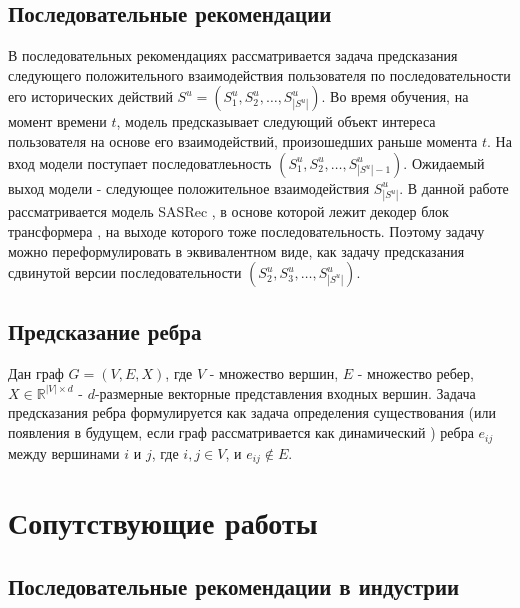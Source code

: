 \documentclass{article}
\begin{document}
\subsection{Последовательные рекомендации}
В последовательных рекомендациях рассматривается задача предсказания следующего положительного взаимодействия 
пользователя по последовательности его исторических действий $S^u = (S_1^u, S_2^u, \dots, S_{|S^u|}^u)$.
Во время обучения, на момент времени $t$, модель предсказывает следующий объект интереса пользователя на основе его
взаимодействий, произошедших раньше момента $t$. На вход модели поступает последоватлеьность
$(S_1^u, S_2^u, \dots, S^u_{|S^u| - 1})$. Ожидаемый выход модели - следующее положительное взаимодействия $S^u_{|S^u|}$. 
В данной работе рассматривается модель SASRec \citep{sasrec}, в основе которой лежит декодер блок трансформера \cite{transformer},
на выходе которого тоже последовательность. 
Поэтому задачу можно переформулировать в эквивалентном виде, как задачу предсказания сдвинутой версии 
последовательности $(S_2^u, S_3^u, \dots, S^u_{|S^u|})$.

\subsection{Предсказание ребра}

Дан граф $G = (V, E, X)$, где $V$ - множество вершин, $E$ - множество ребер, $X \in \mathbb{R}^{|V| \times d}$
- $d$-размерные векторные представления входных вершин. Задача предсказания ребра формулируется как задача
определения существования (или появления в будущем, если граф рассматривается как динамический \cite{dyngnn}) ребра $e_{ij}$
между вершинами $i$ и $j$, где $i, j \in V$, и $e_{ij} \not \in E$.

\section{Сопутствующие работы}

\subsection{Последовательные рекомендации в индустрии}
\end{document}
